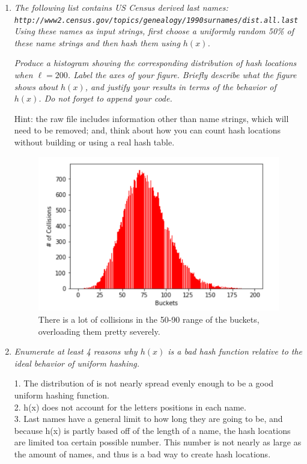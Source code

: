 \documentclass[12pt]{article}
\begin{document}
\begin{enumerate}
	\begin{enumerate}
    	\item\textit{  The following list contains US Census derived last names: }\\
    	\textit{ {\tt http://www2.census.gov/topics/genealogy/1990surnames/dist.all.last} }\\
    	\textit{ Using these names as input strings, first choose a uniformly random 50\% of these name strings and then hash them using $h(x)$.}
    	
    \textit{ 	Produce a histogram showing the corresponding distribution of hash locations when $\ell=200$. Label the axes of your figure. Briefly describe what the figure shows about $h(x)$, and justify your results in terms of the behavior of $h(x)$. Do not forget to append your code.}
    	 
    	{\footnotesize Hint: the raw file includes information other than name strings, which will need to be removed; and, think about how you can count hash locations without building or using a real hash table.}

 \begin{figure}
\includegraphics[scale=.5 ]{Graph}
	There is a lot of collisions in the 50-90 range of the buckets, overloading them pretty severely.
\end{figure}

\newpage
    	\item \textit{ Enumerate at least 4 reasons why $h(x)$ is a bad hash function relative to the ideal behavior of uniform hashing.}

	1. The distribution of is not nearly spread evenly enough to be a good uniform hashing function.\\
	2. h(x) does not account for the letters positions in each name.\\
	3. Last names have a general limit to how long they are going to be, and because h(x) is partly based off of the length of a name, the hash locations are limited toa certain possible number. This number is not nearly as large as the amount of names, and thus is a bad way to create hash locations.\\


\end{enumerate}
\end{enumerate}
\end{document}
